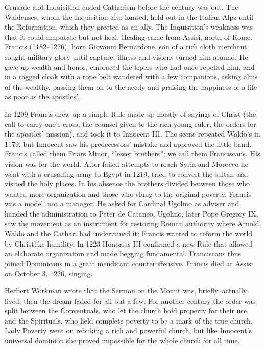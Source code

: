 Crusade and Inquisition ended Catharism before the century was out. The Waldenses, whom the Inquisition also hunted, held out in the Italian Alps until the Reformation, which they greeted as an ally. The
Inquisition's weakness was that it could amputate but not heal. Healing came from Assisi, north of
Rome. Francis (1182--1226), born Giovanni Bernardone, son of a rich cloth merchant, sought military
glory until capture, illness and visions turned him around. He gave up wealth and honor, embraced
the lepers who had once repelled him, and in a ragged cloak with a rope belt wandered with a few
companions, asking alms of the wealthy, passing them on to the needy and praising the happiness of a life as poor as the apostles'.

In 1209 Francis drew up a simple Rule made up mostly of sayings of Christ (the call to carry one's cross, the counsel given to the rich young ruler, the orders for the apostles' mission), and took it to Innocent III. The
scene repeated Waldo's in 1179, but Innocent saw his predecessors' mistake and approved the little
band. Francis called them Friars Minor, ``lesser brothers''; we call them Franciscans. His vision was
for the world. After failed attempts to reach Syria and Morocco he went with a crusading army to
Egypt in 1219, tried to convert the sultan and visited the holy places. In his absence the brothers
divided between those who wanted more organization and those who clung to the original poverty.
Francis was a model, not a manager. He asked for Cardinal Ugolino as adviser and handed the
administration to Peter de Cataneo. Ugolino, later Pope Gregory IX, saw the movement as an instrument
for restoring Roman authority where Arnold, Waldo and the Cathari had undermined it; Francis wanted
to reform the world by Christlike humility. In 1223 Honorius III confirmed a new Rule that allowed
an elaborate organization and made begging fundamental. Franciscans thus joined Dominicans in a great
mendicant counteroffensive. Francis died at Assisi on October 3, 1226, singing.

Herbert Workman wrote that the Sermon on the Mount was, briefly, actually lived; then the
dream faded for all but a few. For another century the order was split between the Conventuals, who
let the church hold property for their use, and the Spirituals, who held complete poverty to be a
mark of the true church. Lady Poverty went on rebuking a rich and powerful church, but like Innocent's universal dominion she proved impossible for the whole church for all time.

